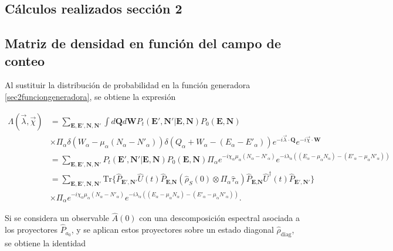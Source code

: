 \begin{appendixs}
	
	\section{Cálculos realizados sección 2}

    \subsection{Matriz de densidad en función del campo de conteo}

    \label{apendix:fcs1}
    Al sustituir la distribución de probabilidad en la función generadora \ref{sec2funciongeneradora}, se obtiene la expresión 

    \begin{align*}
        \Lambda(\vec{\lambda},\vec{\chi}) & = \sum_{\textbf{E},\textbf{E}',\textbf{N},\textbf{N}'} \int d\textbf{Q}d\textbf{W} P_{t}(\textbf{E}',\textbf{N}'|\textbf{E},\textbf{N}) P_{0}(\textbf{E},\textbf{N})  \\
        & \times \Pi_{\alpha} \delta(W_{\alpha} - \mu_{\alpha}(N_{\alpha} - N'_{\alpha}) ) \delta(Q_{\alpha} + W_{\alpha} -(E_{\alpha} - E'_{\alpha})) e^{-i\vec{\lambda}\cdot \textbf{Q}} e^{-i\vec{\chi}\cdot \textbf{W}} \\
        & = \sum_{\textbf{E},\textbf{E}',\textbf{N},\textbf{N}'}P_{t}(\textbf{E}',\textbf{N}'|\textbf{E},\textbf{N})P_{0}(\textbf{E},\textbf{N}) \Pi_{\alpha}e^{-i\chi_{\alpha}\mu_{\alpha}(N_{\alpha} - N'_{\alpha})}e^{-i\lambda_{\alpha}((E_{\alpha} -\mu_{\alpha}N_{\alpha}) - (E'_{\alpha} - \mu_{\alpha}N'_{\alpha}) ) }  \\
        & = \sum_{\textbf{E},\textbf{E}',\textbf{N},\textbf{N}'} \text{Tr}\{\hat{P}_{\textbf{E}',\textbf{N}'}\hat{U}(t)\hat{P}_{\textbf{E},\textbf{N}}(\hat{\rho}_{S}(0) \otimes \Pi_{\alpha}\hat{\tau}_{\alpha} )\hat{P}_{\textbf{E},\textbf{N}}\hat{U}^{\dagger}(t)\hat{P}_{\textbf{E}',\textbf{N}'}   \} \\
        & \times \Pi_{\alpha} e^{-i\chi_{\alpha}\mu_{\alpha}(N_{\alpha} - N'_{\alpha})}e^{-i\lambda_{\alpha}((E_{\alpha} -\mu_{\alpha}N_{\alpha}) - (E'_{\alpha} - \mu_{\alpha}N'_{\alpha}) ) }.
    \end{align*}

Si se considera un observable $\hat{A}(0)$ con una descomposición espectral asociada a los proyectores $\hat{P}_{a_0}$, y se aplican estos proyectores sobre un estado diagonal $\hat{\rho}_{\text{diag}}$, se obtiene la identidad\cite{esposito2009nonequilibrium}


\end{appendixs}
